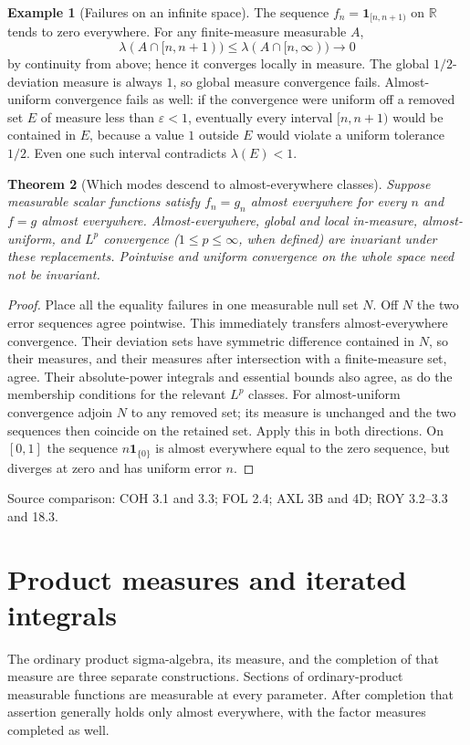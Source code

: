 \documentclass[11pt,oneside,openany]{book}
\newtheorem{theorem}{Theorem}[chapter]
\theoremstyle{definition}
\newtheorem{example}[theorem]{Example}
\theoremstyle{remark}
\newcommand{\R}{\mathbb R}\newcommand{\C}{\mathbb C}
\newcommand{\eps}{\varepsilon}\newcommand{\ee}{\varepsilon}
\newcommand{\one}{\mathbf1}\newcommand{\ind}[1]{\mathbf1_{#1}}
\newcommand{\family}[1]{}
\newcommand{\source}[1]{\par\begingroup\small\sffamily\color{black!65}Source comparison: #1\par\endgroup}
\begin{document}
\begin{example}[Failures on an infinite space]
\family{D11.07.infinite_measure_failures}\label{d11:07:infinite-measure-failures}
The sequence $f_n=\one_{[n,n+1)}$ on $\R$ tends to zero everywhere.
For any finite-measure measurable $A$,
\[
 \lambda(A\cap[n,n+1))\leq\lambda(A\cap[n,\infty))\longrightarrow0
\]
by continuity from above; hence it converges locally in measure.
The global $1/2$-deviation measure is always $1$, so global measure
convergence fails. Almost-uniform convergence fails as well: if the
convergence were uniform off a removed set $E$ of measure less than
$\eps<1$, eventually every interval $[n,n+1)$ would be contained in $E$,
because a value $1$ outside $E$ would violate a uniform tolerance $1/2$.
Even one such interval contradicts $\lambda(E)<1$.
\end{example}

\begin{theorem}[Which modes descend to almost-everywhere classes]
\family{D11.07.ae_invariance_modes}\label{d11:07:ae-invariance-modes}
Suppose measurable scalar functions satisfy $f_n=g_n$ almost everywhere
for every $n$ and $f=g$ almost everywhere. Almost-everywhere, global and
local in-measure, almost-uniform, and $L^p$ convergence ($1\leq p\leq\infty$,
when defined) are invariant under these replacements. Pointwise and
uniform convergence on the whole space need not be invariant.
\end{theorem}
\begin{proof}
Place all the equality failures in one measurable null set $N$. Off $N$
the two error sequences agree pointwise. This immediately transfers
almost-everywhere convergence. Their deviation sets have symmetric
difference contained in $N$, so their measures, and their measures after
intersection with a finite-measure set, agree. Their absolute-power
integrals and essential bounds also agree, as do the membership conditions
for the relevant $L^p$ classes. For almost-uniform convergence adjoin $N$
to any removed set; its measure is unchanged and the two sequences then
coincide on the retained set. Apply this in both directions.
On $[0,1]$ the sequence $n\one_{\{0\}}$ is almost everywhere equal to the
zero sequence, but diverges at zero and has uniform error $n$.
\end{proof}
\source{COH 3.1 and 3.3; FOL 2.4; AXL 3B and 4D; ROY 3.2--3.3 and 18.3.}



\chapter{Product measures and iterated integrals}\label{ch:d11-08}
The ordinary product sigma-algebra, its measure, and the completion of that
measure are three separate constructions. Sections of ordinary-product
measurable functions are measurable at every parameter. After completion
that assertion generally holds only almost everywhere, with the factor
measures completed as well.
\end{document}
